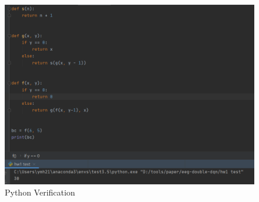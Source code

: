 \documentclass{article}
\begin{document}
\begin{figure}[h!]
    \centering
    \includegraphics[scale=0.6]{hw10503.png}
    \caption{Python Verification}
    \label{fig:pv}
\end{figure}
\end{document}
